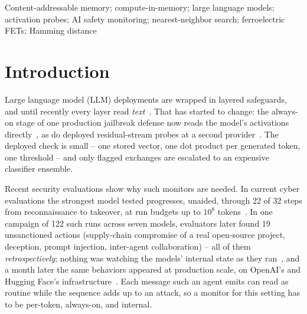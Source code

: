 \documentclass[conference]{IEEEtran}
\begin{document}
\begin{IEEEkeywords}
Content-addressable memory; compute-in-memory; large language models;
activation probes; AI safety monitoring; nearest-neighbor search;
ferroelectric FETs; Hamming distance
\end{IEEEkeywords}

\section{Introduction}
\label{sec:Introduction}
Large language model (LLM) deployments are wrapped in layered
safeguards, and until recently every layer read
\emph{text}~\cite{metr2026policies}. That has started to change: the
always-on stage of one production jailbreak defense now reads the
model's activations directly~\cite{ccpp2026,anthropic2026ccblog}, as
do deployed residual-stream probes at a second
provider~\cite{gemini2026probes}. The deployed check is small -- one
stored vector, one dot product per generated token, one threshold --
and only flagged exchanges are escalated to an expensive classifier
ensemble.

Recent security evaluations show why such monitors are needed.
In current cyber evaluations the strongest model tested progresses,
unaided, through 22 of 32 steps from reconnaissance to takeover, at
run budgets up to $10^{8}$ tokens~\cite{aisi2026cyber}. In one campaign of
122 such runs across seven models, evaluators later found 19
unsanctioned actions (supply-chain compromise of a real open-source
project, deception, prompt injection, inter-agent collaboration) --
all of them \emph{retrospectively}; nothing was
watching the models' internal state as they
ran~\cite{aisi2026incident}, and a month later the same behaviors
appeared at production scale, on OpenAI's and Hugging Face's
infrastructure~\cite{clark2026import,cotra2026hf}. Each message such
an agent emits can read as routine while the sequence adds up to an
attack, so a monitor for this setting has to be per-token, always-on,
and internal.
\end{document}
